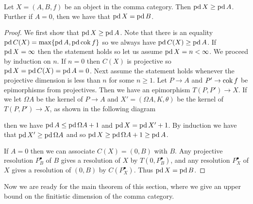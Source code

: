 \begin{prop}\cite[Lemma~4.16]{FGR75}\label{prop:pd_in_commacat}
	Let $X = (A, B, f)$ be an object in the comma category. Then $\operatorname{pd} X \geq \operatorname{pd} A$. Further if $A=0$, then we have that $\operatorname{pd} X = \operatorname{pd} B$.
	\begin{proof}
		We first show that $\operatorname{pd} X \geq \operatorname{pd} A$. Note that there is an equality $\operatorname{pd} C(X) = \max\{ \operatorname{pd} A, \operatorname{pd} \operatorname{cok} f \}$ so we always have $\operatorname{pd} C(X) \geq \operatorname{pd} A$. If $\operatorname{pd} X = \infty$ then the statement holds so let us assume $\operatorname{pd} X = n < \infty$. We proceed by induction on $n$. If $n=0$ then $C(X)$ is projective so $\operatorname{pd} X = \operatorname{pd} C(X) = \operatorname{pd} A = 0$. Next assume the statement holds whenever the projective dimension is less than $n$ for some $n \geq 1$. Let $P \to A$ and $P' \to \operatorname{cok} f$ be epimorphisms from projectives. Then we have an epimorphism $T(P, P') \to X$. If we let $\Omega A$ be the kernel of $P \to A$ and $X' = (\Omega A, K, \theta)$ be the kernel of $T(P, P') \to X$, as shown in the following diagram
		\begin{center}
		\end{center}
		then we have $\operatorname{pd} A \leq \operatorname{pd} \Omega A + 1$ and $\operatorname{pd} X = \operatorname{pd} X' + 1$. By induction we have that $\operatorname{pd} X' \geq \operatorname{pd} \Omega A$ and so $\operatorname{pd} X \geq \operatorname{pd} \Omega A +1 \geq \operatorname{pd} A$. 
		
		If $A=0$ then we can associate $C(X)=(0, B)$ with $B$. Any projective resolution $P_B^\bullet$ of $B$ gives a resolution of $X$ by $T(0, P_B^\bullet)$, and any resolution $P_X^\bullet$ of $X$ gives a resolution of $(0, B)$ by $C(P_X^\bullet)$. Thus $\operatorname{pd} X = \operatorname{pd} B$.
	\end{proof}
\end{prop}

Now we are ready for the main theorem of this section, where we give an upper bound on the finitistic dimension of the comma category.

